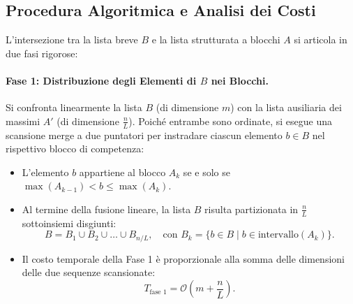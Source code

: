 \subsection{Procedura Algoritmica e Analisi dei Costi}
L'intersezione tra la lista breve $B$ e la lista strutturata a blocchi $A$ si articola in due fasi rigorose:

\paragraph{Fase 1: Distribuzione degli Elementi di $B$ nei Blocchi.}
Si confronta linearmente la lista $B$ (di dimensione $m$) con la lista ausiliaria dei massimi $A'$ (di dimensione $\frac{n}{L}$). Poiché entrambe sono ordinate, si esegue una scansione merge a due puntatori per instradare ciascun elemento $b \in B$ nel rispettivo blocco di competenza:
\begin{itemize}
  \item L'elemento $b$ appartiene al blocco $A_k$ se e solo se $\max(A_{k-1}) < b \le \max(A_k)$.
  \item Al termine della fusione lineare, la lista $B$ risulta partizionata in $\frac{n}{L}$ sottoinsiemi disgiunti:
  \begin{equation}
    B = B_1 \cup B_2 \cup \dots \cup B_{n/L}, \quad \text{con } B_k = \{b \in B \mid b \in \text{intervallo}(A_k)\}.
  \end{equation}
  \item Il costo temporale della Fase 1 è proporzionale alla somma delle dimensioni delle due sequenze scansionate:
  \begin{equation}
    T_{\text{fase 1}} = \mathcal{O}\left(m + \frac{n}{L}\right).
  \end{equation}
\end{itemize}

